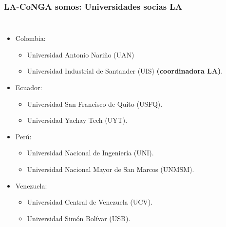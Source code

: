 \begin{frame}[fragile]
\frametitle{LA-CoNGA somos: Universidades socias LA}
\begin{columns}[c] %

\begin{itemize}
	\item Colombia:
	\begin{itemize}
		\item Universidad Antonio Nariño (UAN)
		\item Universidad Industrial de Santander
(UIS) {\bf (coordinadora LA)}.
		\end{itemize}
	\item Ecuador:
	\begin{itemize}
		\item Universidad San Francisco de Quito
(USFQ).
		\item Universidad Yachay Tech (UYT).
		\end{itemize}
	\item Perú:
	\begin{itemize}
		\item Universidad Nacional de Ingeniería
(UNI).
		\item Universidad Nacional Mayor de San
Marcos (UNMSM).
		\end{itemize}
	\item Venezuela:
	\begin{itemize}
		\item Universidad Central de Venezuela
(UCV).
		\item Universidad Simón Bolívar (USB).
		\end{itemize}
\end{itemize}



\end{columns}
\end{frame}
